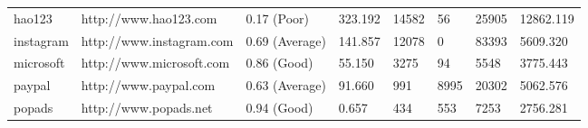 \begin{table}[]
{\begin{tabular}{|l|l|l|l|l|l|l|l|}
hao123            & http://www.hao123.com      & 0.17 (Poor)                                                                                & 323.192                                                                           & 14582                                                          & 56                                                            & 25905                                                                & 12862.119                                                                      \\
\rowcolor[HTML]{EFEFEF} 
instagram         & http://www.instagram.com   & 0.69 (Average)                                                                                & 141.857                                                                           & 12078                                                          & 0                                                             & 83393                                                                & 5609.320                                                                       \\
microsoft         & http://www.microsoft.com   & 0.86 (Good)                                                                                                                                                               & 55.150                                                                            & 3275                                                           & 94                                                            & 5548                                                                 & 3775.443                                                                       \\
\rowcolor[HTML]{EFEFEF} 
paypal            & http://www.paypal.com      & 0.63 (Average)                                                                                & 91.660                                                                            & 991                                                            & 8995                                                          & 20302                                                                & 5062.576                                                                       \\
popads            & http://www.popads.net      & 0.94 (Good)                                                                                                                                                               & 0.657                                                                             & 434                                                            & 553                                                           & 7253                                                                 & 2756.281                                                                       \\

\end{tabular}}
\end{table}

